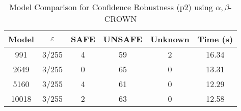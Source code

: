 \begin{table}[htbp]
\centering
\caption{Model Comparison for Confidence Robustness (p2) using $\alpha,\beta$-CROWN}
\label{tab:p2_abcrown_model_comparison}
\begin{tabular}{|c|c|c|c|c|c|}
\hline
Model & $\varepsilon$ & SAFE & UNSAFE & Unknown & Time (s) \\ \hline
991 & 3/255 & 4 & 59 & 2 & 16.34 \\ \hline
2649 & 3/255 & 0 & 65 & 0 & 13.31 \\ \hline
5160 & 3/255 & 4 & 61 & 0 & 12.29 \\ \hline
10018 & 3/255 & 2 & 63 & 0 & 12.58 \\ \hline
\end{tabular}
\end{table}
